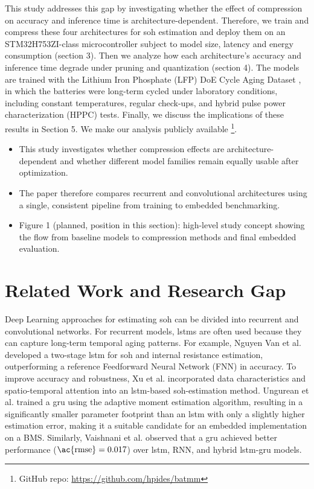 \documentclass[final,3p,times]{elsarticle}
\begin{document}
This study addresses this gap by investigating whether the effect of compression on accuracy and inference time is architecture-dependent. Therefore, we train and compress these four architectures for \ac{soh} estimation and deploy them on an STM32H753ZI-class microcontroller subject to model size, latency and energy consumption (section 3). Then we analyze how each architecture's accuracy and inference time degrade under pruning and quantization (section 4). The models are trained with the Lithium Iron Phosphate (LFP) DoE Cycle Aging Dataset \cite{rzepka_design_2025}, in which the batteries were long-term cycled under laboratory conditions, including constant temperatures, regular check-ups, and hybrid pulse power characterization (HPPC) tests. Finally, we discuss the implications of these results in Section 5. We make our analysis publicly available \footnote{GitHub repo: \url{https://github.com/hpides/batmm}}.

\begin{itemize}[leftmargin=*] 
\item This study investigates whether compression effects are architecture-dependent and whether different model families remain equally usable after optimization.
\item The paper therefore compares recurrent and convolutional architectures using a single, consistent pipeline from training to embedded benchmarking.
\item Figure 1 (planned, position in this section): high-level study concept showing the flow from baseline models to compression methods and final embedded evaluation.
\end{itemize}

\section{\texorpdfstring{Related Work and Research Gap}{Related Work and Research Gap}}
Deep Learning approaches for estimating \ac{soh} can be divided into recurrent and convolutional networks. For recurrent models, \acp{lstm} are often used because they can capture long-term temporal aging patterns. For example, Nguyen Van et al. \cite{nguyen_van_estimation_2023} developed a two-stage \ac{lstm} for \ac{soh} and internal resistance estimation, outperforming a reference Feedforward Neural Network (FNN) in accuracy. To improve accuracy and robustness, Xu et al. \cite{xu_lstm-based_2024} incorporated data characteristics and spatio-temporal attention into an \ac{lstm}-based \ac{soh}-estimation method. Ungurean et al. \cite{ungurean_online_2020} trained a \ac{gru} using the adaptive moment estimation algorithm, resulting in a significantly smaller parameter footprint than an \ac{lstm} with only a slightly higher estimation error, making it a suitable candidate for an embedded implementation on a BMS. Similarly, Vaishnani et al. \cite{vaishnani_deep_2024} observed that a \ac{gru} achieved better performance ($\text{\ac{rmse}} = 0.017$) over \ac{lstm}, RNN, and hybrid \ac{lstm}-\ac{gru} models.
\end{document}
